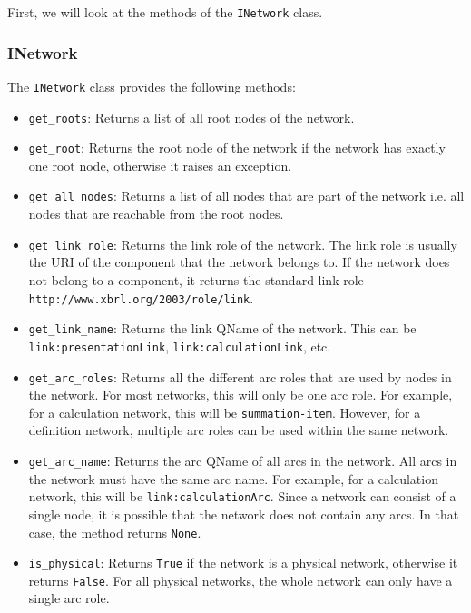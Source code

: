 First, we will look at the methods of the \texttt{INetwork} class.

\subsubsection{INetwork}

The \texttt{INetwork} class provides the following methods:

\begin{itemize}
    \item \texttt{get\_roots}: Returns a list of all root nodes of the network.
    \item \texttt{get\_root}: Returns the root node of the network if the network has exactly one root node, otherwise it raises an exception.
    \item \texttt{get\_all\_nodes}: Returns a list of all nodes that are part of the network i.e. all nodes that are reachable from the root nodes.
    \item \texttt{get\_link\_role}: Returns the link role of the network. 
    The link role is usually the URI of the component that the network belongs to.
    If the network does not belong to a component, it returns the standard link role \texttt{http://www.xbrl.org/2003/role/link}.
    \item \texttt{get\_link\_name}: Returns the link QName of the network.
    This can be \texttt{link:presentationLink}, \texttt{link:calculationLink}, etc.
    \item \texttt{get\_arc\_roles}: Returns all the different arc roles that are used by nodes in the network.
    For most networks, this will only be one arc role.
    For example, for a calculation network, this will be \texttt{summation-item}.
    However, for a definition network, multiple arc roles can be used within the same network.
    \item \texttt{get\_arc\_name}: Returns the arc QName of all arcs in the network.
    All arcs in the network must have the same arc name.
    For example, for a calculation network, this will be \texttt{link:calculationArc}.
    Since a network can consist of a single node, it is possible that the network does not contain any arcs.
    In that case, the method returns \texttt{None}.
    \item \texttt{is\_physical}: Returns \texttt{True} if the network is a physical network, otherwise it returns \texttt{False}.
    For all physical networks, the whole network can only have a single arc role.
\end{itemize}

